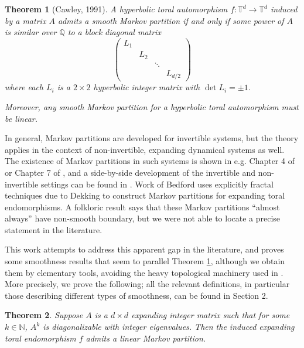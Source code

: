 \documentclass{article}
\def\N{\mathbb{N}}
\def\Q{\mathbb{Q}}
\def\T{\mathbb{T}}
\newtheorem{theorem}{Theorem}[section]
\begin{document}
\begin{theorem}[Cawley, 1991]\label{thm:Cawley}
    A hyperbolic toral automorphism $f:\T^d\to\T^d$ induced by a matrix $A$ admits a smooth Markov partition if and only if some power of $A$ is similar over $\Q$ to a block diagonal matrix $$\begin{pmatrix}
        L_1 & & & \\
        & L_2 & & \\
        & & \ddots & \\
        & & & L_{d/2}
    \end{pmatrix}$$
    where each $L_i$ is a $2\times 2$ hyperbolic integer matrix with $\det L_i = \pm1$. 

    Moreover, any smooth Markov partition for a hyperbolic toral automorphism must be linear.
\end{theorem}

In general, Markov partitions are developed for invertible systems, but the theory applies in the context of non-invertible, expanding dynamical systems as well. The existence of Markov partitions in such systems is shown in e.g. Chapter 4 of \cite{URM} or Chapter 7 of \cite{Ru}, and a side-by-side development of the invertible and non-invertible settings can be found in \cite{AKS}. Work of Bedford \cite{Be} uses explicitly fractal techniques due to Dekking \cite{D} to construct Markov partitions for expanding toral endomorphisms. A folkloric result says that these Markov partitions ``almost always'' have non-smooth boundary, but we were not able to locate a precise statement in the literature.

This work attempts to address this apparent gap in the literature, and proves some smoothness results that seem to parallel Theorem \ref{thm:Cawley}, although we obtain them by elementary tools, avoiding the heavy topological machinery used in \cite{C}. More precisely, we prove the following; all the relevant definitions, in particular those describing different types of smoothness, can be found in Section 2. 



\begin{theorem}\label{thm:power diag with integer eigenvals implies smooth MP}
    Suppose $A$ is a $d\times d$ expanding integer matrix such that for some $k\in\N$, $A^k$ is diagonalizable with integer eigenvalues. Then the induced expanding toral endomorphism $f$ admits a linear Markov partition.
\end{theorem}
\end{document}

